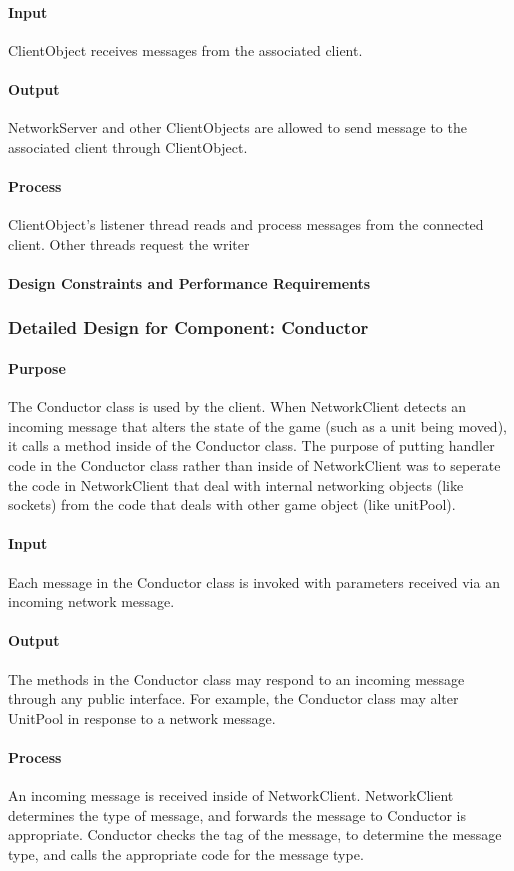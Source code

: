 \documentclass[12pt,a4paper,titlepage]{article}
\begin{document}
\paragraph{Input} ClientObject receives messages from the associated client. 
\paragraph{Output} NetworkServer and other ClientObjects are allowed
to send message to the associated client through ClientObject.
\paragraph{Process} ClientObject's listener thread reads and process messages from the connected client. Other threads request the writer
\paragraph{Design Constraints and Performance Requirements}

\subsubsection{Detailed Design for Component: Conductor}
\paragraph{Purpose} The Conductor class is used by the client. When NetworkClient detects an incoming message that alters the state of the game (such as a unit being moved), it calls a method inside of the Conductor class. The purpose of putting handler code in the Conductor class rather than inside of NetworkClient was to seperate the code in NetworkClient that deal with internal networking objects (like sockets) from the code that deals with other game object (like unitPool).
\paragraph{Input} Each message in the Conductor class is invoked with parameters received via an incoming network message.
\paragraph{Output} The methods in the Conductor class may respond to an incoming message through any public interface. For example, the Conductor class may alter UnitPool in response to a network message.
\paragraph{Process} An incoming message is received inside of NetworkClient. NetworkClient determines the type of message, and forwards the message to Conductor is appropriate. Conductor checks the tag of the message, to determine the message type, and calls the appropriate code for the message type.
\end{document}
